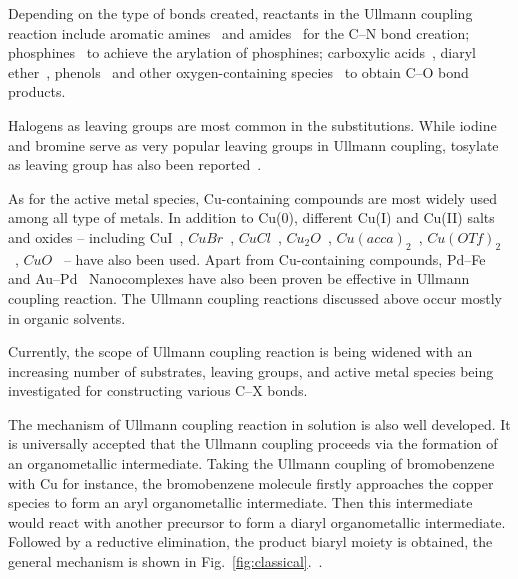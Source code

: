 \documentclass[%
 reprint,
 amsmath,amssymb,
 aps,
prb,
]{revtex4-2}
\begin{document}
Depending on the type of bonds created, reactants in the Ullmann coupling reaction include aromatic amines~\cite{ullmann_17,ullmann_18} and amides~\cite{ullmann_19,ullmann_20} for the C--N bond creation; phosphines~\cite{ullmann_21,ullmann_22} to achieve the arylation of phosphines; carboxylic acids~\cite{ullmann_23}, diaryl ether~\cite{ullmann_24}, phenols~\cite{ullmann_25} and other oxygen-containing species~\cite{ullmann_26,ullmann_27,ullmann_28} to obtain C--O bond products.

Halogens as leaving groups are most common in the substitutions. While iodine and bromine serve as very popular leaving groups in Ullmann coupling, tosylate as leaving group has also been reported~\cite{ullmann_15}. 

As for the active metal species, Cu-containing compounds are most widely used among all type of metals. In addition to Cu(0), different Cu(I) and Cu(II) salts and oxides -- including CuI~\cite{ullmann_07,ullmann_08,ullmann_09}, $CuBr$~\cite{ullmann_10,ullmann_11}, $CuCl$~\cite{ullmann_13}, $Cu_2O$~\cite{ullmann_12}, $Cu(acca)_2$~\cite{ullmann_14}, $Cu(OTf)_2$~\cite{ullmann_15}, $CuO$~\cite{ullmann_16} -- have also been used. Apart from Cu-containing compounds, Pd–Fe~\cite{ullmann_35} and Au–Pd~\cite{ullmann_36} Nanocomplexes have also been proven be effective in Ullmann coupling reaction. The Ullmann coupling reactions discussed above occur mostly in organic solvents. 

Currently, the scope of Ullmann coupling reaction is being widened with an increasing number of substrates, leaving groups, and active metal species being investigated for constructing various C--X bonds. 


The mechanism of Ullmann coupling reaction in solution is also well developed. It is universally accepted that the Ullmann coupling proceeds via the formation of an organometallic intermediate. Taking the Ullmann coupling of bromobenzene with Cu for instance, the bromobenzene molecule firstly approaches the copper species to form an aryl organometallic intermediate. Then this intermediate would react with another precursor to form a diaryl organometallic intermediate. Followed by a reductive elimination, the product biaryl moiety is obtained, the general mechanism is shown in Fig.~\ref{fig:classical}.~\cite{ullmann_37}.
\end{document}

